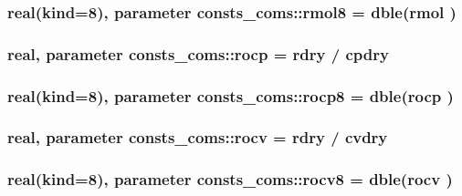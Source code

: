 \subsubsection[{\texorpdfstring{rmol8}{rmol8}}]{\setlength{\rightskip}{0pt plus 5cm}real(kind=8), parameter consts\+\_\+coms\+::rmol8 = dble({\bf rmol} )}\hypertarget{namespaceconsts__coms_a3addc2c9f3482a3de83c7c18c2f462f4}{}\label{namespaceconsts__coms_a3addc2c9f3482a3de83c7c18c2f462f4}
\subsubsection[{\texorpdfstring{rocp}{rocp}}]{\setlength{\rightskip}{0pt plus 5cm}real, parameter consts\+\_\+coms\+::rocp = {\bf rdry} / {\bf cpdry}}\hypertarget{namespaceconsts__coms_a6d1614e0bc215795946d72dd2dab1a16}{}\label{namespaceconsts__coms_a6d1614e0bc215795946d72dd2dab1a16}
\subsubsection[{\texorpdfstring{rocp8}{rocp8}}]{\setlength{\rightskip}{0pt plus 5cm}real(kind=8), parameter consts\+\_\+coms\+::rocp8 = dble({\bf rocp} )}\hypertarget{namespaceconsts__coms_ac4ade9a3b8fe371cd399acb298f58675}{}\label{namespaceconsts__coms_ac4ade9a3b8fe371cd399acb298f58675}
\subsubsection[{\texorpdfstring{rocv}{rocv}}]{\setlength{\rightskip}{0pt plus 5cm}real, parameter consts\+\_\+coms\+::rocv = {\bf rdry} / {\bf cvdry}}\hypertarget{namespaceconsts__coms_ac7edb2bbabc26e076bd858ad71bcb824}{}\label{namespaceconsts__coms_ac7edb2bbabc26e076bd858ad71bcb824}
\subsubsection[{\texorpdfstring{rocv8}{rocv8}}]{\setlength{\rightskip}{0pt plus 5cm}real(kind=8), parameter consts\+\_\+coms\+::rocv8 = dble({\bf rocv} )}\hypertarget{namespaceconsts__coms_a1897d51960a771bcbb6ee081645dcc58}{}\label{namespaceconsts__coms_a1897d51960a771bcbb6ee081645dcc58}
